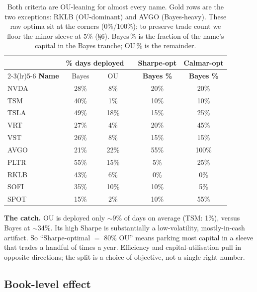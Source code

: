 \documentclass[11pt]{article}
\begin{document}
\begin{table}[h]\centering\small
\renewcommand{\arraystretch}{1.15}
\begin{tabular}{l cc c cc}
\toprule
& \multicolumn{2}{c}{\textbf{\% days deployed}} & & \textbf{Sharpe-opt} & \textbf{Calmar-opt}\\
\cmidrule(lr){2-3}\cmidrule(lr){5-6}
\textbf{Name} & Bayes & OU & & \textbf{Bayes \%} & \textbf{Bayes \%}\\
\midrule
NVDA & 28\% & 8\%  & & 20\% & 20\%\\
TSM  & 40\% & 1\%  & & 10\% & 10\%\\
TSLA & 49\% & 18\% & & 15\% & 25\%\\
VRT  & 27\% & 4\%  & & 20\% & 45\%\\
VST  & 26\% & 8\%  & & 15\% & 15\%\\
\rowcolor{bcact} AVGO & 21\% & 22\% & & 55\% & 100\%\\
PLTR & 55\% & 15\% & & 5\%  & 25\%\\
\rowcolor{bcact} RKLB & 43\% & 6\%  & & 0\%  & 0\%\\
SOFI & 35\% & 10\% & & 10\% & 5\%\\
SPOT & 15\% & 2\%  & & 10\% & 55\%\\
\bottomrule
\end{tabular}
\caption*{\footnotesize Both criteria are OU-leaning for almost every name. Gold rows are the
two exceptions: RKLB (OU-dominant) and AVGO (Bayes-heavy). These raw optima sit at the corners
(0\%/100\%); to preserve trade count we floor the minor sleeve at 5\% (\S6). Bayes\,\% is the
fraction of the name's capital in the Bayes tranche; OU\,\% is the remainder.}
\end{table}

\textbf{The catch.} OU is deployed only $\sim$9\% of days on average (TSM: 1\%), versus Bayes at
$\sim$34\%. Its high Sharpe is substantially a low-volatility, mostly-in-cash artifact. So
``Sharpe-optimal $=$ 80\% OU'' means parking most capital in a sleeve that trades a handful of
times a year. Efficiency and capital-utilisation pull in opposite directions; the split is a
choice of objective, not a single right number.

\subsection{Book-level effect}
\end{document}
